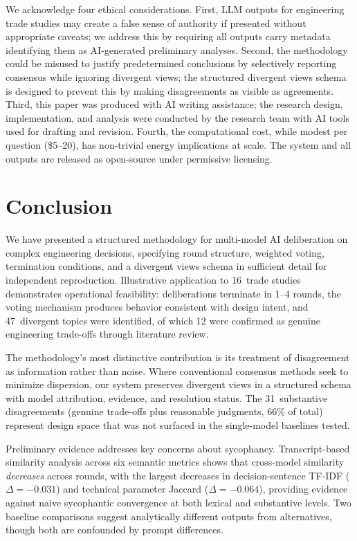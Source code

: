 \documentclass[11pt,a4paper]{article}
\begin{document}
We acknowledge four ethical considerations. First, LLM outputs for engineering trade studies may create a false sense of authority if presented without appropriate caveats; we address this by requiring all outputs carry metadata identifying them as AI-generated preliminary analyses. Second, the methodology could be misused to justify predetermined conclusions by selectively reporting consensus while ignoring divergent views; the structured divergent views schema is designed to prevent this by making disagreements as visible as agreements. Third, this paper was produced with AI writing assistance; the research design, implementation, and analysis were conducted by the research team with AI tools used for drafting and revision. Fourth, the computational cost, while modest per question (\$5--20), has non-trivial energy implications at scale. The system and all outputs are released as open-source under permissive licensing.

\section{Conclusion}
\label{sec:conclusion}

We have presented a structured methodology for multi-model AI deliberation on complex engineering decisions, specifying round structure, weighted voting, termination conditions, and a divergent views schema in sufficient detail for independent reproduction. Illustrative application to 16~trade studies demonstrates operational feasibility: deliberations terminate in 1--4 rounds, the voting mechanism produces behavior consistent with design intent, and 47~divergent topics were identified, of which 12 were confirmed as genuine engineering trade-offs through literature review.

The methodology's most distinctive contribution is its treatment of disagreement as information rather than noise. Where conventional consensus methods seek to minimize dispersion, our system preserves divergent views in a structured schema with model attribution, evidence, and resolution status. The 31~substantive disagreements (genuine trade-offs plus reasonable judgments, 66\% of total) represent design space that was not surfaced in the single-model baselines tested.

Preliminary evidence addresses key concerns about sycophancy. Transcript-based similarity analysis across six semantic metrics shows that cross-model similarity \emph{decreases} across rounds, with the largest decreases in decision-sentence TF-IDF ($\Delta = -0.031$) and technical parameter Jaccard ($\Delta = -0.064$), providing evidence against naive sycophantic convergence at both lexical and substantive levels. Two baseline comparisons suggest analytically different outputs from alternatives, though both are confounded by prompt differences.
\end{document}
